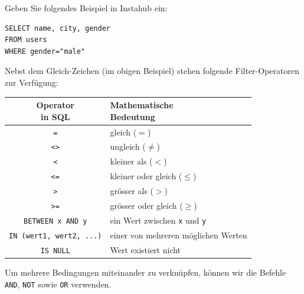 \begin{myexample}
Geben Sie folgendes Beispiel in Instahub ein:

\begin{lstlisting}[style=sql]
SELECT name, city, gender
FROM users
WHERE gender="male"
\end{lstlisting}
\end{myexample}

Nebst dem Gleich-Zeichen (im obigen Beispiel) stehen folgende Filter-Operatoren zur Verfügung:
\begin{table}[H]
  \centering
  \begin{tabular}{c|l}
    \makecell{\textbf{Operator}                                                                 \\\textbf{in \gls{SQL}}} & \makecell{\textbf{Mathematische}\\\textbf{Bedeutung}} \\\midrule
    \texttt{=}                                    & gleich ($=$)                                \\
    \texttt{<>}                                   & ungleich ($\neq$)                           \\
    \texttt{<}                                    & kleiner als ($<$)                           \\
    \texttt{<=}                                   & kleiner oder gleich ($\leq$)                \\
    \texttt{>}                                    & grösser als ($>$)                           \\
    \texttt{>=}                                   & grösser oder gleich ($\geq$)                \\
    \lstinline[style=sql]|BETWEEN x AND y|        & ein Wert zwischen \texttt{x} und \texttt{y} \\
    \lstinline[style=sql]|IN (wert1, wert2, ...)| & einer von mehreren möglichen Werten         \\
    \lstinline[style=sql]|IS NULL|                & Wert existiert nicht                        \\
  \end{tabular}
\end{table}
Um mehrere Bedingungen miteinander zu verknüpfen, können wir die Befehle \lstinline[style=sql]|AND|, \lstinline[style=sql]|NOT| sowie \lstinline[style=sql]|OR| verwenden.

